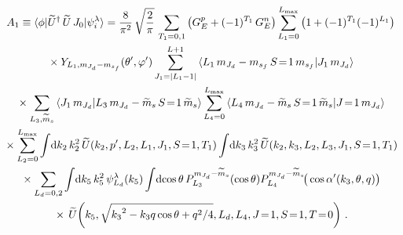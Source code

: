   \begin{multline}
   A_1 \equiv \la \phi | \widetilde{U}^\dag \, \widetilde{U}\, J_0 |
   \psi_i^\lambda \ra  = \frac{8}{\pi^2} \,\sqrt{\frac{2}{\pi}} \,
   \sum_{T_1 = 0,1} \big(G_E ^p + (-1)^{T_1} \,G_E^n\big)
   \sum_{L_1 = 0}^{L_{\rm max}} \big(1 + (-1)^{T_1} (-1)^{L_1}\big) \\
   \null \times
   Y_{L_1 , \mJd - \msf} (\thetacm, \phicm)
   \sum_{J_1 = |L_1 - 1|}^{L+1}
   \CG{L_1}{\mJd - \msf}{S\!=\!1}{\msf}{J_1}{\mJd} \\
   \null \times \sum_{L_3, \widetilde{m}_s}
   \braket{J_1 \, \mJd}{L_3 \, \mJd - \wt{m}_s \, S\!=\!1 \, \wt{m}_s}
   \sum_{L_4 = 0}^{L_{\rm max}}
   \CG{L_4}{\mJd - \widetilde{m}_s}{S\!=\!1}{\widetilde{m}_s}{J\!=\!1}{\mJd} \\
   \null \times
   \sum_{L_2 = 0}^{L_{\rm max}} \int \! \dd k_2 \, k_2^2 \,
    \widetilde{U} (k_2, \pp, L_2, L_1, J_1, S\!=\!1, T_1)
   \int \! \dd k_3 \, k_3^2 \,
    \widetilde{U} (k_2, k_3, L_2, L_3, J_1, S\!=\!1, T_1) \\
   \null \times
   \sum_{L_d = 0, 2} \int \! \dd k_5 \, k_5^2 \, \psi_{L_d}^\lambda (k_5)
   \int \! \dcostheta \, P_{L_3}^{\mJd - \widetilde{m}_s}(\cos \theta)
   P_{L_4}^{\mJd - \widetilde{m}_s}\!\big(\cos\thetacprime(k_3, \theta, q)\big)
   \\  \null \times
   \,\widetilde{U}\!\left(
    k_5, \sqrt{{k_3}^2 - k_3 q \cos\theta  + q^2/4}, L_d, L_4, J\!=\!1, S\!=\!1,
    T\!=\!0  \right) \,.
  \end{multline}

